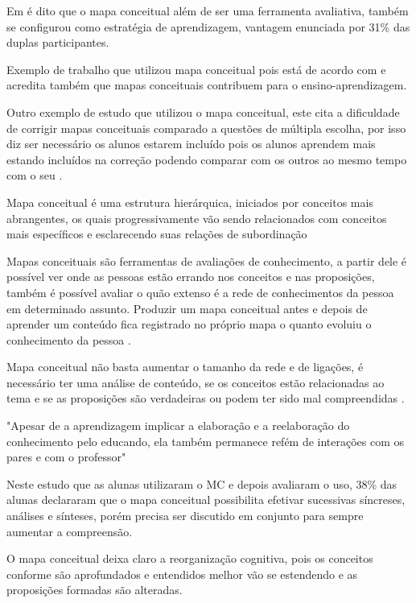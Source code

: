 Em \cite{vantagensDesvantagensMC} é dito que o mapa conceitual além de ser uma ferramenta avaliativa, também se configurou como estratégia de aprendizagem, vantagem enunciada por 31\% das duplas participantes.

Exemplo de trabalho que utilizou mapa conceitual \cite{leiDeNewtonMC} pois está de acordo com \cite{novak} e acredita também que mapas conceituais contribuem para o ensino-aprendizagem. 

Outro exemplo de estudo que utilizou o mapa conceitual, este cita a dificuldade de corrigir mapas conceituais comparado a questões de múltipla escolha, por isso diz ser necessário os alunos estarem incluído pois os alunos aprendem mais estando incluídos na correção podendo comparar com os outros ao mesmo tempo com o seu \cite{dificuldadesMapaConceitual}.

Mapa conceitual é uma estrutura hierárquica, iniciados por conceitos mais abrangentes, os quais progressivamente vão sendo relacionados com conceitos mais específicos e esclarecendo suas relações de subordinação 

Mapas conceituais são ferramentas de avaliações de conhecimento, a partir dele é possível ver onde as pessoas estão errando nos conceitos e nas proposições, também é possível avaliar o quão extenso é a rede de conhecimentos da pessoa em determinado assunto. Produzir um mapa conceitual antes e depois de aprender um conteúdo fica registrado no próprio mapa o quanto evoluiu o conhecimento da pessoa \cite{vantagensDesvantagensMC}.

Mapa conceitual não basta aumentar o tamanho da rede e de ligações, é necessário ter uma análise de conteúdo, se os conceitos estão relacionadas ao tema e se as proposições são verdadeiras ou podem ter sido mal compreendidas \cite{vantagensDesvantagensMC}.

"Apesar de a aprendizagem implicar a elaboração e a reelaboração do conhecimento pelo educando, ela também permanece refém de interações com os pares e com o professor" \cite[p. 180]{vantagensDesvantagensMC}

Neste estudo \cite{vantagensDesvantagensMC} que as alunas utilizaram o MC e depois avaliaram o uso, 38\% das alunas declararam que o mapa conceitual possibilita efetivar sucessivas síncreses, análises e sínteses, porém precisa ser discutido em conjunto para sempre aumentar a compreensão.

O mapa conceitual deixa claro a reorganização cognitiva, pois os conceitos conforme são aprofundados e entendidos melhor vão se estendendo e as proposições formadas são alteradas.\cite{vantagensDesvantagensMC}




